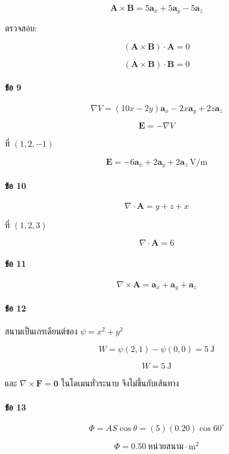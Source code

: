 \[
\boxed{\mathbf{A}\times\mathbf{B}=5\mathbf{a}_x+5\mathbf{a}_y-5\mathbf{a}_z}
\]

ตรวจสอบ:

\[
(\mathbf{A}\times\mathbf{B})\cdot\mathbf{A}=0
\]

\[
(\mathbf{A}\times\mathbf{B})\cdot\mathbf{B}=0
\]

\paragraph{ข้อ 9}

\[
\nabla V=(10x-2y)\mathbf{a}_x-2x\mathbf{a}_y+2z\mathbf{a}_z
\]

\[
\mathbf{E}=-\nabla V
\]

ที่ \((1,2,-1)\)

\[
\boxed{\mathbf{E}=-6\mathbf{a}_x+2\mathbf{a}_y+2\mathbf{a}_z\ \text{V/m}}
\]

\paragraph{ข้อ 10}

\[
\nabla\cdot\mathbf{A}=y+z+x
\]

ที่ \((1,2,3)\)

\[
\boxed{\nabla\cdot\mathbf{A}=6}
\]

\paragraph{ข้อ 11}

\[
\boxed{\nabla\times\mathbf{A}=\mathbf{a}_x+\mathbf{a}_y+\mathbf{a}_z}
\]

\paragraph{ข้อ 12}

สนามเป็นเกรเดียนต์ของ \(\psi=x^2+y^2\)

\[
W=\psi(2,1)-\psi(0,0)=5\ \text{J}
\]

\[
\boxed{W=5\ \text{J}}
\]

และ \(\nabla\times\mathbf{F}=\mathbf{0}\) ในโดเมนทั่วระนาบ จึงไม่ขึ้นกับเส้นทาง

\paragraph{ข้อ 13}

\[
\Phi=AS\cos\theta=(5)(0.20)\cos60^\circ
\]

\[
\boxed{\Phi=0.50\ \text{หน่วยสนาม}\cdot\text{m}^2}
\]

